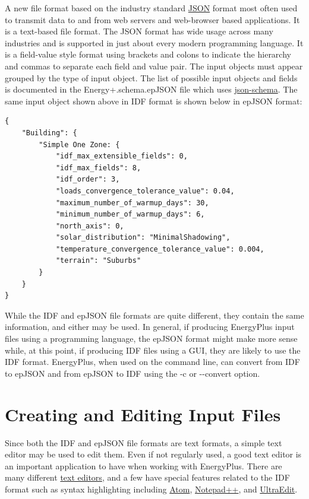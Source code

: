 A new file format based on the industry standard \href{https://www.json.org/}{JSON}
format most often used to transmit data to and from web servers and
web-browser based applications. It is a text-based file format. The
JSON format has wide usage across many industries and is supported
in just about every modern programming language. It is a field-value
style format using brackets and colons to indicate the hierarchy and
commas to separate each field and value pair. The input objects must
appear grouped by the type of input object. The list of possible input
objects and fields is documented in the Energy+.schema.epJSON file
which uses \href{http://json-schema.org/}{json-schema}. The same
input object shown above in IDF format is shown below in epJSON format:
\begin{verbatim}
{
    "Building": {
        "Simple One Zone: {
            "idf_max_extensible_fields": 0,
            "idf_max_fields": 8,
            "idf_order": 3,
            "loads_convergence_tolerance_value": 0.04,
            "maximum_number_of_warmup_days": 30,
            "minimum_number_of_warmup_days": 6,
            "north_axis": 0,
            "solar_distribution": "MinimalShadowing",
            "temperature_convergence_tolerance_value": 0.004,
            "terrain": "Suburbs"
        }
    }
}
\end{verbatim}
While the IDF and epJSON file formats are quite different, they contain
the same information, and either may be used. In general, if producing
EnergyPlus input files using a programming language, the epJSON format
might make more sense while, at this point, if producing IDF files
using a GUI, they are likely to use the IDF format. EnergyPlus, when
used on the command line, can convert from IDF to epJSON and from
epJSON to IDF using the -c or -{}-convert option.

\section{Creating and Editing Input Files}

Since both the IDF and epJSON file formats are text formats, a simple
text editor may be used to edit them. Even if not regularly used,
a good text editor is an important application to have when working
with EnergyPlus. There are many different \href{https://en.wikipedia.org/wiki/Comparison_of_text_editors}{text editors},
and a few have special features related to the IDF format such as
syntax highlighting including \href{https://github.com/bigladder/atom-language-energyplus}{Atom},
\href{https://github.com/jmarrec/notepad}{Notepad++}, and \href{http://energyplus.helpserve.com/knowledgebase/article/View/102/47/ultraedit-syntax-highlighting-file---v80}{UltraEdit}.

